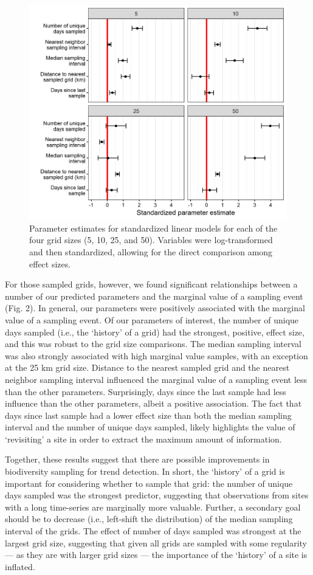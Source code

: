 \documentclass[9pt,twocolumn,twoside,lineno]{pnas-new}
\begin{document}
\begin{figure}[!hb]
\centering
\includegraphics[width=.8\linewidth]{param_estimates.png}
\caption{Parameter estimates for standardized linear models for each of the four grid sizes (5, 10, 25, and 50). Variables were log-transformed and then standardized, allowing for the direct comparison among effect sizes.}
\label{fig2}
\end{figure}

For those sampled grids, however, we found significant relationships between a number of our predicted parameters and the marginal value of a sampling event (Fig. 2). In general, our parameters were positively associated with the marginal value of a sampling event. Of our parameters of interest, the number of unique days sampled (i.e., the `history' of a grid) had the strongest, positive, effect size, and this was robust to the grid size comparisons. The median sampling interval was also strongly associated with high marginal value samples, with an exception at the 25 km grid size. Distance to the nearest sampled grid and the nearest neighbor sampling interval influenced the marginal value of a sampling event less than the other parameters. Surprisingly, days since the last sample had less influence than the other parameters, albeit a positive association. The fact that days since last sample had a lower effect size than both the median sampling interval and the number of unique days sampled, likely highlights the value of `revisiting' a site in order to extract the maximum amount of information.

Together, these results suggest that there are possible improvements in biodiversity sampling for trend detection. In short, the `history' of a grid is important for considering whether to sample that grid: the number of unique days sampled was the strongest predictor, suggesting that observations from sites with a long time-series are marginally more valuable. Further, a secondary goal should be to decrease (i.e., left-shift the distribution) of the median sampling interval of the grids. The effect of number of days sampled was strongest at the largest grid size, suggesting that given all grids are sampled with some regularity --- as they are with larger grid sizes --- the importance of the `history' of a site is inflated.
\end{document}
